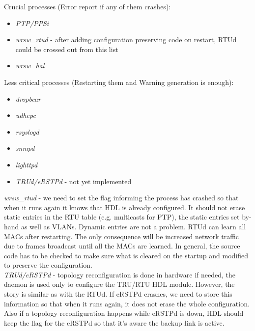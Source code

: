 \begin{pck_descr}
				Crucial processes (Error report if any of them crashes):
				\begin{itemize}
					\item \emph{PTP/PPSi}
					\item \emph{wrsw\_rtud} - after adding configuration preserving code
						on restart, RTUd could be crossed out from this list
					\item \emph{wrsw\_hal}
				\end{itemize}
				Less critical processes (Restarting them and Warning generation is
				enough):
				\begin{itemize}
					\item \emph{dropbear}
					\item \emph{udhcpc}
					\item \emph{rsyslogd}
					\item \emph{snmpd}
					\item \emph{lighttpd}
					\item \emph{TRUd/eRSTPd} - not yet implemented
				\end{itemize}

				\emph{wrsw\_rtud} - we need to set the flag informing the process has
				crashed so that when it runs again it knows that HDL is already
				configured. It should not erase static entries in the RTU table (e.g.
				multicasts for PTP), the static entries set by-hand as well as VLANs.
				Dynamic entries are not a problem. RTUd can learn all MACs after
				restarting. The only consequence will be increased network traffic due
				to frames broadcast until all the MACs are learned. In general,
				the source code has to be checked to make sure what is cleared on the
				startup and modified to preserve the configuration.\\

				\emph{TRUd/eRSTPd} - topology reconfiguration is done in hardware if
				needed, the daemon is used only to configure the TRU/RTU HDL module.
				However, the story is similar as with the RTUd. If eRSTPd crashes, we
				need to store this information so that when it runs again, it does not
				erase the whole configuration. Also if a topology reconfiguration
				happens while eRSTPd is down, HDL should keep the flag for the eRSTPd so
				that it's aware the backup link is active.
		\end{pck_descr}

